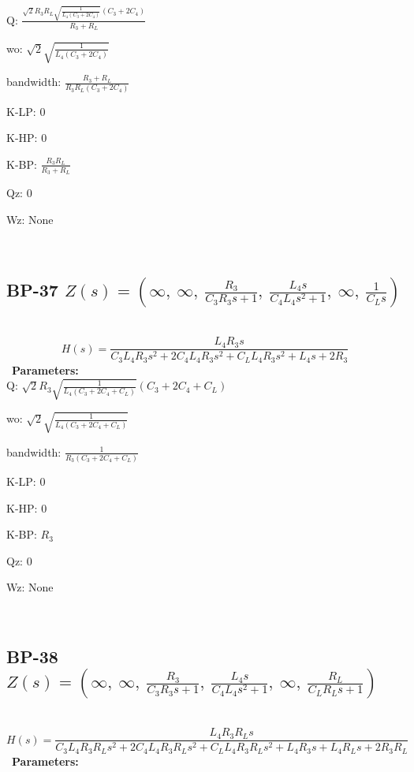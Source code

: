 \documentclass{article}
\begin{document}
Q: $\frac{\sqrt{2} R_{3} R_{L} \sqrt{\frac{1}{L_{4} \left(C_{3} + 2 C_{4}\right)}} \left(C_{3} + 2 C_{4}\right)}{R_{3} + R_{L}}$\ 

wo: $\sqrt{2} \sqrt{\frac{1}{L_{4} \left(C_{3} + 2 C_{4}\right)}}$\ 

bandwidth: $\frac{R_{3} + R_{L}}{R_{3} R_{L} \left(C_{3} + 2 C_{4}\right)}$\ 

K-LP: $0$\ 

K-HP: $0$\ 

K-BP: $\frac{R_{3} R_{L}}{R_{3} + R_{L}}$\ 

Qz: $0$\ 

Wz: $\text{None}$\ 

\ 

\subsection{BP-37 $Z(s) = \left( \infty, \  \infty, \  \frac{R_{3}}{C_{3} R_{3} s + 1}, \  \frac{L_{4} s}{C_{4} L_{4} s^{2} + 1}, \  \infty, \  \frac{1}{C_{L} s}\right)$ } \ 
\textbf{\[H(s) = \frac{L_{4} R_{3} s}{C_{3} L_{4} R_{3} s^{2} + 2 C_{4} L_{4} R_{3} s^{2} + C_{L} L_{4} R_{3} s^{2} + L_{4} s + 2 R_{3}}\] } \ 
\textbf{Parameters:}\\ 

Q: $\sqrt{2} R_{3} \sqrt{\frac{1}{L_{4} \left(C_{3} + 2 C_{4} + C_{L}\right)}} \left(C_{3} + 2 C_{4} + C_{L}\right)$\ 

wo: $\sqrt{2} \sqrt{\frac{1}{L_{4} \left(C_{3} + 2 C_{4} + C_{L}\right)}}$\ 

bandwidth: $\frac{1}{R_{3} \left(C_{3} + 2 C_{4} + C_{L}\right)}$\ 

K-LP: $0$\ 

K-HP: $0$\ 

K-BP: $R_{3}$\ 

Qz: $0$\ 

Wz: $\text{None}$\ 

\ 

\subsection{BP-38 $Z(s) = \left( \infty, \  \infty, \  \frac{R_{3}}{C_{3} R_{3} s + 1}, \  \frac{L_{4} s}{C_{4} L_{4} s^{2} + 1}, \  \infty, \  \frac{R_{L}}{C_{L} R_{L} s + 1}\right)$ } \ 
\textbf{\[H(s) = \frac{L_{4} R_{3} R_{L} s}{C_{3} L_{4} R_{3} R_{L} s^{2} + 2 C_{4} L_{4} R_{3} R_{L} s^{2} + C_{L} L_{4} R_{3} R_{L} s^{2} + L_{4} R_{3} s + L_{4} R_{L} s + 2 R_{3} R_{L}}\] } \ 
\textbf{Parameters:}\\ 
\end{document}
